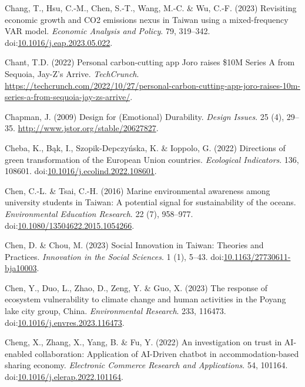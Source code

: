 \documentclass[
  letterpaper,
  DIV=11,
  numbers=noendperiod]{scrartcl}
\newlength{\cslhangindent}
\newenvironment{CSLReferences}[2] %
 {\begin{list}{}{%
  \setlength{\itemindent}{0pt}
  \setlength{\leftmargin}{0pt}
  \setlength{\parsep}{0pt}
  \ifodd #1
   \setlength{\leftmargin}{\cslhangindent}
   \setlength{\itemindent}{-1\cslhangindent}
  \fi
  \setlength{\itemsep}{#2\baselineskip}}}
 {\end{list}}
\begin{document}
\begin{CSLReferences}{0}{1}
Chang, T., Hsu, C.-M., Chen, S.-T., Wang, M.-C. \& Wu, C.-F. (2023)
Revisiting economic growth and {CO2} emissions nexus in {Taiwan} using a
mixed-frequency {VAR} model. \emph{Economic Analysis and Policy}. 79,
319--342.
doi:\href{https://doi.org/10.1016/j.eap.2023.05.022}{10.1016/j.eap.2023.05.022}.

Chant, T.D. (2022) Personal carbon-cutting app {Joro} raises \${10M
Series A} from {Sequoia}, {Jay-Z}'s {Arrive}. \emph{TechCrunch}.
\url{https://techcrunch.com/2022/10/27/personal-carbon-cutting-app-joro-raises-10m-series-a-from-sequoia-jay-zs-arrive/}.

Chapman, J. (2009) Design for ({Emotional}) {Durability}. \emph{Design
Issues}. 25 (4), 29--35. \url{http://www.jstor.org/stable/20627827}.

Cheba, K., Bąk, I., Szopik-Depczyńska, K. \& Ioppolo, G. (2022)
Directions of green transformation of the {European Union} countries.
\emph{Ecological Indicators}. 136, 108601.
doi:\href{https://doi.org/10.1016/j.ecolind.2022.108601}{10.1016/j.ecolind.2022.108601}.

Chen, C.-L. \& Tsai, C.-H. (2016) Marine environmental awareness among
university students in {Taiwan}: A potential signal for sustainability
of the oceans. \emph{Environmental Education Research}. 22 (7),
958--977.
doi:\href{https://doi.org/10.1080/13504622.2015.1054266}{10.1080/13504622.2015.1054266}.

Chen, D. \& Chou, M. (2023) Social {Innovation} in {Taiwan}: {Theories}
and {Practices}. \emph{Innovation in the Social Sciences}. 1 (1), 5--43.
doi:\href{https://doi.org/10.1163/27730611-bja10003}{10.1163/27730611-bja10003}.

Chen, Y., Duo, L., Zhao, D., Zeng, Y. \& Guo, X. (2023) The response of
ecosystem vulnerability to climate change and human activities in the
{Poyang} lake city group, {China}. \emph{Environmental Research}. 233,
116473.
doi:\href{https://doi.org/10.1016/j.envres.2023.116473}{10.1016/j.envres.2023.116473}.

Cheng, X., Zhang, X., Yang, B. \& Fu, Y. (2022) An investigation on
trust in {AI-enabled} collaboration: {Application} of {AI-Driven}
chatbot in accommodation-based sharing economy. \emph{Electronic
Commerce Research and Applications}. 54, 101164.
doi:\href{https://doi.org/10.1016/j.elerap.2022.101164}{10.1016/j.elerap.2022.101164}.


\end{CSLReferences}
\end{document}
